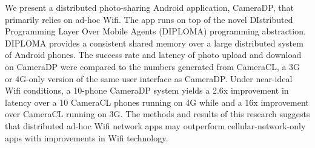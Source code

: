 We present a distributed photo-sharing Android application, CameraDP, that primarily relies on ad-hoc Wifi. The app runs on top of the novel DIstributed Programming Layer Over Mobile Agents (DIPLOMA) programming abstraction. DIPLOMA provides a consistent shared memory over a large distributed system of Android phones. The success rate and latency of photo upload and download on CameraDP were compared to the numbers generated from CameraCL, a 3G or 4G-only version of the same user interface as CameraDP. Under near-ideal Wifi conditions, a 10-phone CameraDP system yields a 2.6x improvement in latency over a 10 CameraCL phones running on 4G while and a 16x improvement over CameraCL running on 3G. The methods and results of this research suggests that distributed ad-hoc Wifi network apps may outperform cellular-network-only apps with improvements in Wifi technology.

